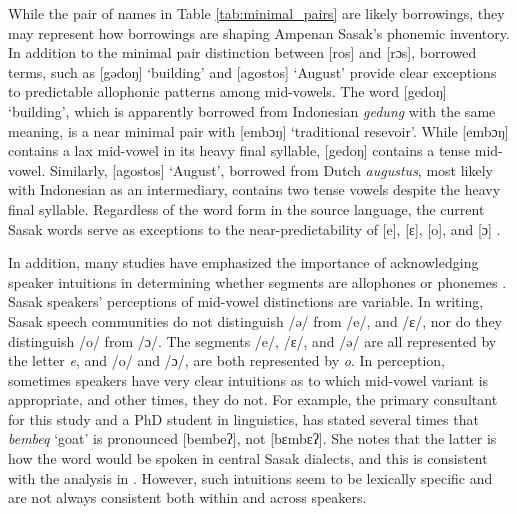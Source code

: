 \documentclass[12pt]{ouparticle}
\begin{document}
While the pair of names in Table \ref{tab:minimal_pairs} are likely borrowings, they may represent how borrowings are shaping Ampenan Sasak's phonemic inventory. In addition to the minimal pair distinction between [ros] and [rɔs], borrowed terms, such as [gədoŋ] `building’ and [agostos] `August' provide clear exceptions to predictable allophonic patterns among mid-vowels. The word [gedoŋ] `building', which is apparently borrowed from Indonesian \textit{gedung} with the same meaning, is a near minimal pair with [embɔŋ] `traditional resevoir'. While [embɔŋ] contains a lax mid-vowel in its heavy final syllable, [gedoŋ] contains a tense mid-vowel. Similarly, [agostos] `August', borrowed from Dutch \textit{augustus}, most likely with Indonesian as an intermediary, contains two tense vowels despite the heavy final syllable. Regardless of the word form in the source language, the current Sasak words serve as exceptions to the near-predictability of [e], [ɛ], [o], and [ɔ] .

In addition, many studies have emphasized the importance of acknowledging speaker intuitions in determining whether segments are allophones or phonemes \citep{hualde2005,scobbie2008}. Sasak speakers' perceptions of mid-vowel distinctions are variable. In writing, Sasak speech communities do not distinguish /ə/ from /e/, and /ɛ/, nor do they distinguish /o/ from /ɔ/. The segments /e/, /ɛ/, and /ə/ are all represented by the letter \textit{e}, and /o/ and /ɔ/, are both represented by \textit{o}. In perception, sometimes speakers have very clear intuitions as to which mid-vowel variant is appropriate, and other times, they do not. For example, the primary consultant for this study and a PhD student in linguistics, has stated several times that \textit{bembeq} `goat'  is pronounced [bembeʔ], not [bɛmbɛʔ]. She notes that the latter is how the word would be spoken in central Sasak dialects, and this is consistent with the analysis in \citet[]{chahal1998}. However, such intuitions seem to be lexically specific and are not always consistent both within and across speakers. 
\end{document}
